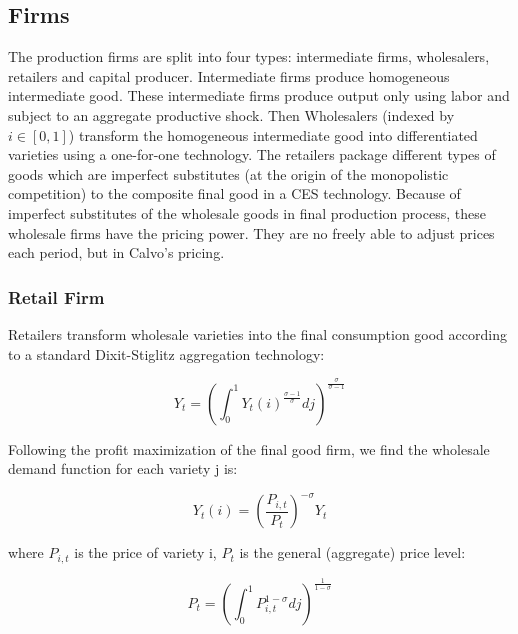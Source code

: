 \documentclass[10pt,math=newtx,citestyle=gb7714-2015,bibstyle=gb7714-2015]{elegantbook}
\begin{document}
{{{			
			
			\subsection{Firms}
			
			The production firms are split into four types: intermediate firms, wholesalers, retailers and capital producer. Intermediate firms produce homogeneous intermediate good. These intermediate firms produce output only using labor and subject to an aggregate productive shock. Then Wholesalers (indexed by $i \in [0, 1]$) transform the homogeneous intermediate good into differentiated varieties using a one-for-one technology. The retailers package different types of goods which are imperfect substitutes (at the origin of the monopolistic competition) to the composite final good in a CES technology. Because of imperfect substitutes of the wholesale goods in final production process, these wholesale firms have the pricing power. They are no freely able to adjust prices each period, but in Calvo's pricing.
			
			\subsubsection{Retail Firm}
			
			Retailers transform wholesale varieties into the final consumption good according to a standard Dixit-Stiglitz aggregation technology:
			
			\begin{equation}
				Y_t=\left(\int_0^1Y_t(i)^{\frac{\sigma-1}{\sigma}}dj \right)^{\frac{\sigma}{\sigma-1}}
			\end{equation}
			
			Following the profit maximization of the final good firm, we find the wholesale demand function for each variety j is:
			
			\begin{equation}
				Y_t(i)=\left(\frac{P_{i,t}}{P_t}\right)^{-\sigma}Y_t
			\end{equation}
			
			where $P_{i,t}$ is the price of variety i, $P_t$ is the general (aggregate) price level:
			
			\begin{equation}
				P_t=\left(\int_0^1P_{i,t}^{1-\sigma}dj\right)^{\frac{1}{1-\sigma}}
			\end{equation}
			
}}}
\end{document}
